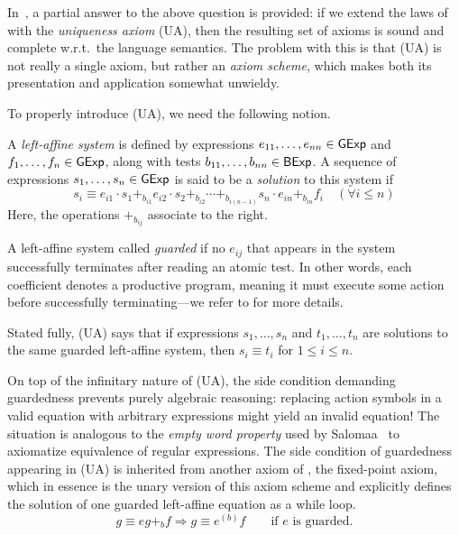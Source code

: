 \documentclass[orivec,envcountsect,envcountsame]{llncs}
\begin{document}
    In~\cite{gkatpopl}, a partial answer to the above question is provided: if we extend the laws of \GKAT with the \emph{uniqueness axiom} (\textsf{UA}), then the resulting set of axioms is sound and complete w.r.t.\ the language semantics.
    The problem with this is that (\textsf{UA}) is not really a single axiom, but rather an \emph{axiom scheme}, which makes both its presentation and application somewhat unwieldy.

    To properly introduce (\textsf{UA}), we need the following notion.
    \begin{definition}
        A \emph{left-affine system} is defined by expressions $e_{11}, \dots, e_{nn} \in \mathsf{GExp}$ and $f_1, \dots, f_n \in \mathsf{GExp}$, along with tests $b_{11}, \dots, b_{nn} \in \mathsf{BExp}$.
        A sequence of expressions $s_1, \dots, s_n \in \mathsf{GExp}$ is said to be a \emph{solution} to this system if
        \[
            s_i \equiv e_{i1} \cdot s_1 +_{b_{i1}} e_{i2} \cdot s_2 +_{b_{i2}} \cdots +_{b_{i(n-1)}} s_{n} \cdot e_{in} +_{b_{in}} f_i \quad (\forall i \leq n)
        \]
        Here, the operations $+_{b_{ij}}$ associate to the right.

        A left-affine system called \emph{guarded} if no \(e_{ij}\) that appears in the system successfully terminates after reading an atomic test.
        In other words, each coefficient denotes a productive program, meaning it must execute some action before successfully terminating---we refer to  for more details.
    \end{definition}
    Stated fully, (\textsf{UA}) says that if expressions  $s_1, \dots, s_n$ and $t_1, \dots, t_n$ are solutions to the same guarded left-affine system, then $s_i \equiv t_i$ for $1 \leq i \leq n$.

    On top of the infinitary nature of (\textsf{UA}), the side condition demanding guardedness prevents purely algebraic reasoning: replacing action symbols in a valid \GKAT equation with arbitrary \GKAT expressions might yield an invalid equation!
    The situation is analogous to the \emph{empty word property} used by Salomaa~\cite{salomaa} to axiomatize equivalence of regular expressions.
    The side condition of guardedness appearing in (\textsf{UA}) is inherited from another axiom of \GKAT, the fixed-point axiom, which in essence is the unary version of this axiom scheme and explicitly defines the solution of one guarded left-affine equation as a while loop.
    \[
    g \equiv eg +_b f \Longrightarrow g \equiv e^{(b)} f \qquad \text{if $e$ is guarded}.
    \]
\end{document}
